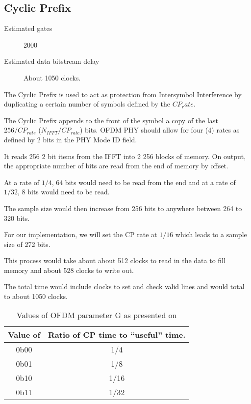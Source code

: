 

\subsection{Cyclic Prefix}
\label{sec:cyclic_prefix}
\begin{description}
	\item[Estimated gates] 2000
	\item[Estimated data bitstream delay] About 1050 clocks.
\end{description}

The Cyclic Prefix is used to act as protection from Intersymbol Interference 
by duplicating a certain number of symbols defined by the $CP_rate$.

The Cyclic Prefix appends to the front of the symbol a copy of the last
$256/CP_{rate}$ ($N_{IFFT}/CP_{rate}$) bits. OFDM PHY should allow for four
(4) rates as defined by 2 bits in the PHY Mode ID field. 

It reads 256 2 bit items from the IFFT into 2 256 blocks of memory.
On output, the appropriate number of bits are read from the end of 
memory by offset.

At a rate of $1/4$, 64 bits would need to be read from the end and 
at a rate of $1/32$, 8 bits would need to be read.

The sample size would then increase from 256 bits to anywhere between
264 to 320 bits.

For our implementation, we will set the CP rate at $1/16$ which leads to
a sample size of 272 bits.

This process would take about about 512 clocks to read in the data to fill
memory and about 528 clocks to write out. 

The total time would include clocks to set and check valid lines and would
total to about 1050 clocks. 

\begin{table}
\begin{tabulary}{\linewidth}{C|C}
	\label{tbl:param-g-vals}
	Value of  & Ratio of CP time to
	``useful'' time. \\ \hline

	0b00 & 1/4 \\
	0b01 & 1/8 \\
	0b10 & 1/16 \\
	0b11 & 1/32 \\

\end{tabulary}
\caption{Values of OFDM parameter G as presented on
}
\end{table}

